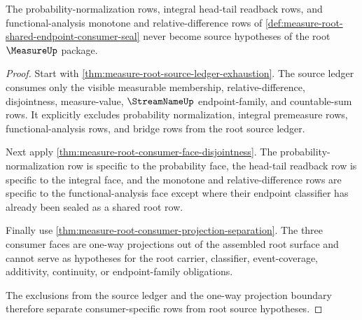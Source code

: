 \begin{theorem}
\label{thm:measure-root-consumer-face-source-separation}
The probability-normalization rows, integral head-tail readback rows, and
functional-analysis monotone and relative-difference rows of
\autoref{def:measure-root-shared-endpoint-consumer-seal} never become source
hypotheses of the root $\MeasureUp$ package.
\end{theorem}
\begin{proof}
Start with \autoref{thm:measure-root-source-ledger-exhaustion}. The source
ledger consumes only the visible measurable membership,
relative-difference, disjointness, measure-value, $\StreamNameUp$
endpoint-family, and countable-sum rows. It explicitly excludes probability
normalization, integral premeasure rows, functional-analysis rows, and bridge
rows from the root source ledger.

Next apply \autoref{thm:measure-root-consumer-face-disjointness}. The
probability-normalization row is specific to the probability face, the
head-tail readback row is specific to the integral face, and the monotone and
relative-difference rows are specific to the functional-analysis face except
where their endpoint classifier has already been sealed as a shared root row.

Finally use \autoref{thm:measure-root-consumer-projection-separation}. The
three consumer faces are one-way projections out of the assembled root
surface and cannot serve as hypotheses for the root carrier, classifier,
event-coverage, additivity, continuity, or endpoint-family obligations.

The exclusions from the source ledger and the one-way projection boundary
therefore separate consumer-specific rows from root source hypotheses.
\end{proof}

